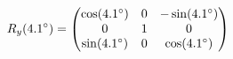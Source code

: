 \documentclass[preview]{standalone}
\begin{document}
\begin{align*}
\special{dvisvgm:raw <g id='unique000'>}R_y(4.1^\circ) = \begin{pmatrix} \cos(4.1^\circ) & 0 & -\sin(4.1^\circ) \\ 0 & 1 & 0 \\ \sin(4.1^\circ) & 0 & \cos(4.1^\circ) \end{pmatrix}\special{dvisvgm:raw </g>}
\end{align*}
\end{document}
